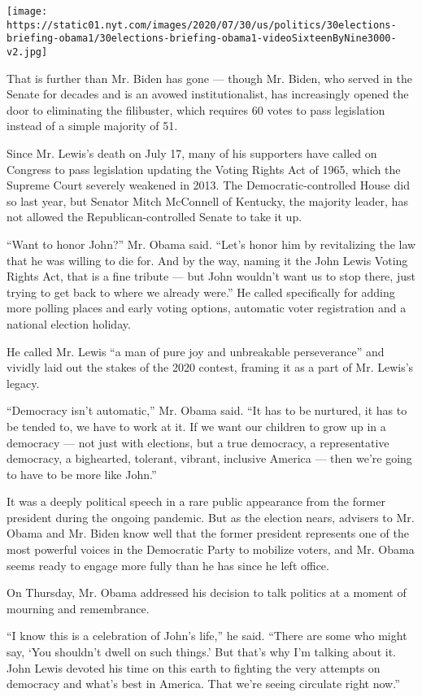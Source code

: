 \texttt{[image: https://static01.nyt.com/images/2020/07/30/us/politics/30elections-briefing-obama1/30elections-briefing-obama1-videoSixteenByNine3000-v2.jpg]}

That is further than Mr. Biden has gone --- though Mr. Biden, who served
in the Senate for decades and is an avowed institutionalist, has
increasingly opened the door to eliminating the filibuster, which
requires 60 votes to pass legislation instead of a simple majority of
51.

Since Mr. Lewis's death on July 17, many of his supporters have called
on Congress to pass legislation updating the Voting Rights Act of 1965,
which the Supreme Court severely weakened in 2013. The
Democratic-controlled House did so last year, but Senator Mitch
McConnell of Kentucky, the majority leader, has not allowed the
Republican-controlled Senate to take it up.

``Want to honor John?'' Mr. Obama said. ``Let's honor him by
revitalizing the law that he was willing to die for. And by the way,
naming it the John Lewis Voting Rights Act, that is a fine tribute ---
but John wouldn't want us to stop there, just trying to get back to
where we already were.'' He called specifically for adding more polling
places and early voting options, automatic voter registration and a
national election holiday.

He called Mr. Lewis ``a man of pure joy and unbreakable perseverance''
and vividly laid out the stakes of the 2020 contest, framing it as a
part of Mr. Lewis's legacy.

``Democracy isn't automatic,'' Mr. Obama said. ``It has to be nurtured,
it has to be tended to, we have to work at it. If we want our children
to grow up in a democracy --- not just with elections, but a true
democracy, a representative democracy, a bighearted, tolerant, vibrant,
inclusive America --- then we're going to have to be more like John.''

It was a deeply political speech in a rare public appearance from the
former president during the ongoing pandemic. But as the election nears,
advisers to Mr. Obama and Mr. Biden know well that the former president
represents one of the most powerful voices in the Democratic Party to
mobilize voters, and Mr. Obama seems ready to engage more fully than he
has since he left office.

On Thursday, Mr. Obama addressed his decision to talk politics at a
moment of mourning and remembrance.

``I know this is a celebration of John's life,'' he said. ``There are
some who might say, `You shouldn't dwell on such things.' But that's why
I'm talking about it. John Lewis devoted his time on this earth to
fighting the very attempts on democracy and what's best in America. That
we're seeing circulate right now.''

